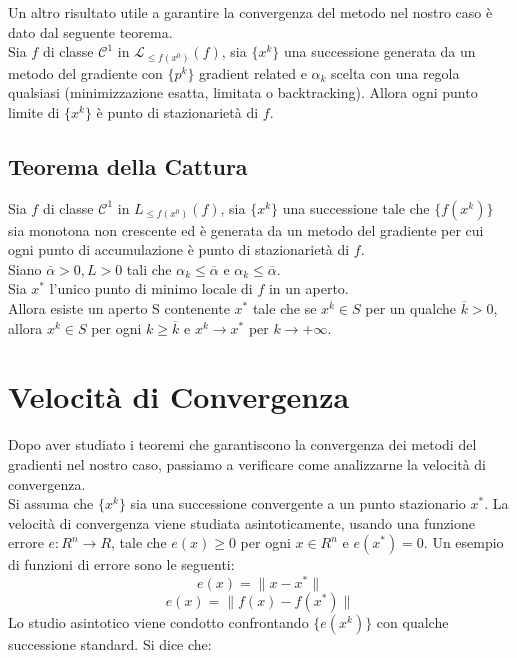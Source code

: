 \documentclass{report}
\begin{document}
Un altro risultato utile a garantire la convergenza del metodo nel nostro caso è dato dal seguente teorema.\\
Sia $f$ di classe $\mathcal{C}^1$ in $\mathcal{L}_{\leqslant f(x^0)}(f)$, sia $\{ x^k\}$ una successione generata da un metodo del gradiente con $\{ p^k\}$ gradient related e $\alpha_k$ scelta con una regola qualsiasi (minimizzazione esatta, limitata o backtracking). Allora ogni punto limite di $\{ x^k\}$ è punto di stazionarietà di $f$.

\subsection{Teorema della Cattura}
Sia $f$ di classe $\mathcal{C}^1$ in $L_{\leqslant f(x^0)}(f)$, sia $\{ x^k\}$ una successione tale che $\{ f(x^k)\}$ sia monotona non crescente ed è generata da un metodo del gradiente per cui ogni punto  di accumulazione è punto di stazionarietà di $f$.\\
Siano $\overline{\alpha} > 0, L > 0 $ tali che $\alpha_k \leqslant \overline{\alpha}$ e $\alpha_k \leqslant \overline{\alpha}$.\\
Sia $x^*$ l'unico punto di minimo locale di $f$ in un aperto.\\
Allora esiste un aperto S contenente $x^*$ tale che se $x^{\overline{k}} \in S$ per un qualche $\overline{k} > 0$, allora $x^k \in S$ per ogni $k \geqslant \overline{k}$ e $x^k \rightarrow x^*$ per $k \rightarrow +\infty$.

\section{Velocità di Convergenza}
Dopo aver studiato i teoremi che garantiscono la convergenza dei metodi del gradienti nel nostro caso, passiamo a verificare come analizzarne la velocità di convergenza.\\

Si assuma che $\{x^k\}$ sia una successione convergente a un punto stazionario $x^*$. La velocità di convergenza viene studiata asintoticamente, usando una funzione errore $e : R^n \rightarrow R$, tale che $e(x) \geqslant 0$ per ogni $x \in R^n$ e $e(x^*) = 0$. Un esempio di funzioni di errore sono le seguenti:
\begin{equation}
\label{funz_errore1}
	e(x) = \| x - x^*\|
\end{equation}
\begin{equation}
\label{funz_errore2}
	e(x) = \| f(x) - f(x^*)\|
\end{equation}
Lo studio asintotico viene condotto confrontando $\{e(x^k )\}$ con qualche successione standard. Si dice che:
\end{document}
